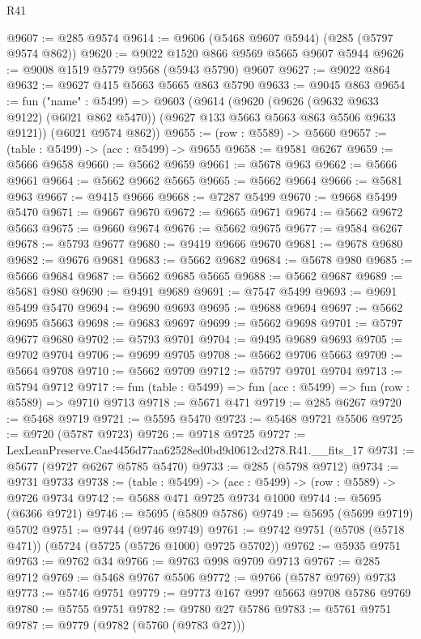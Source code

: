 \begin{lexlean}{R41}
\begin{coremodule}
@9607 := @285 @9574
@9614 := @9606 (@5468 @9607 @5944) (@285 (@5797 @9574 @862))
@9620 := @9022 @1520 @866 @9569 @5665 @9607 @5944
@9626 := @9008 @1519 @5779 @9568 (@5943 @5790) @9607
@9627 := @9022 @864
@9632 := @9627 @415 @5663 @5665 @863 @5790
@9633 := @9045 @863
@9654 := fun ("name" : @5499) =>
  @9603
    (@9614
      (@9620
        (@9626 (@9632 @9633 @9122) (@6021 @862 @5470))
        (@9627 @133 @5663 @5663 @863 @5506 @9633 @9121))
      (@6021 @9574 @862))
@9655 := (row : @5589) -> @5660
@9657 := (table : @5499) -> (acc : @5499) -> @9655
@9658 := @9581 @6267
@9659 := @5666 @9658
@9660 := @5662 @9659
@9661 := @5678 @963
@9662 := @5666 @9661
@9664 := @5662 @9662 @5665
@9665 := @5662 @9664
@9666 := @5681 @963
@9667 := @9415 @9666
@9668 := @7287 @5499
@9670 := @9668 @5499 @5470
@9671 := @9667 @9670
@9672 := @9665 @9671
@9674 := @5662 @9672 @5663
@9675 := @9660 @9674
@9676 := @5662 @9675
@9677 := @9584 @6267
@9678 := @5793 @9677
@9680 := @9419 @9666 @9670
@9681 := @9678 @9680
@9682 := @9676 @9681
@9683 := @5662 @9682
@9684 := @5678 @980
@9685 := @5666 @9684
@9687 := @5662 @9685 @5665
@9688 := @5662 @9687
@9689 := @5681 @980
@9690 := @9491 @9689
@9691 := @7547 @5499
@9693 := @9691 @5499 @5470
@9694 := @9690 @9693
@9695 := @9688 @9694
@9697 := @5662 @9695 @5663
@9698 := @9683 @9697
@9699 := @5662 @9698
@9701 := @5797 @9677 @9680
@9702 := @5793 @9701
@9704 := @9495 @9689 @9693
@9705 := @9702 @9704
@9706 := @9699 @9705
@9708 := @5662 @9706 @5663
@9709 := @5664 @9708
@9710 := @5662 @9709
@9712 := @5797 @9701 @9704
@9713 := @5794 @9712
@9717 := fun (table : @5499) => fun (acc : @5499) => fun (row : @5589) => @9710 @9713
@9718 := @5671 @471
@9719 := @285 @6267
@9720 := @5468 @9719
@9721 := @5595 @5470
@9723 := @5468 @9721 @5506
@9725 := @9720 (@5787 @9723)
@9726 := @9718 @9725
@9727 := LexLeanPreserve.Cae4456d77aa62528ed0bd9d0612cd278.R41.__fits_17
@9731 := @5677 (@9727 @6267 @5785 @5470)
@9733 := @285 (@5798 @9712)
@9734 := @9731 @9733
@9738 := (table : @5499) -> (acc : @5499) -> (row : @5589) -> @9726 @9734
@9742 := @5688 @471 @9725 @9734 @1000
@9744 := @5695 (@6366 @9721)
@9746 := @5695 (@5809 @5786)
@9749 := @5695 (@5699 @9719) @5702
@9751 := @9744 (@9746 @9749)
@9761 := @9742 @9751 (@5708 (@5718 @471)) (@5724 (@5725 (@5726 @1000) @9725 @5702))
@9762 := @5935 @9751
@9763 := @9762 @34
@9766 := @9763 @998 @9709 @9713
@9767 := @285 @9712
@9769 := @5468 @9767 @5506
@9772 := @9766 (@5787 @9769) @9733
@9773 := @5746 @9751
@9779 := @9773 @167 @997 @5663 @9708 @5786 @9769
@9780 := @5755 @9751
@9782 := @9780 @27 @5786
@9783 := @5761 @9751
@9787 := @9779 (@9782 (@5760 (@9783 @27)))

\end{coremodule}
\end{lexlean}
